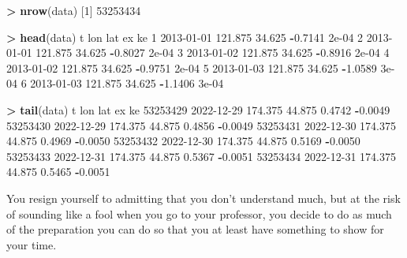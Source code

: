 \documentclass[
  10t,
]{article}
\newenvironment{Shaded}{\begin{snugshade}}{\end{snugshade}}
\newcommand{\DecValTok}[1]{\textcolor[rgb]{0.00,0.00,0.81}{#1}}
\newcommand{\FloatTok}[1]{\textcolor[rgb]{0.00,0.00,0.81}{#1}}
\newcommand{\FunctionTok}[1]{\textcolor[rgb]{0.13,0.29,0.53}{\textbf{#1}}}
\newcommand{\NormalTok}[1]{#1}
\newcommand{\SpecialCharTok}[1]{\textcolor[rgb]{0.81,0.36,0.00}{\textbf{#1}}}
\begin{document}
\begin{Shaded}
\begin{Highlighting}[]
\SpecialCharTok{\textgreater{}} \FunctionTok{nrow}\NormalTok{(data)}
\NormalTok{[}\DecValTok{1}\NormalTok{] }\DecValTok{53253434}

\SpecialCharTok{\textgreater{}} \FunctionTok{head}\NormalTok{(data)}
\NormalTok{           t     lon    lat      ex    ke}
\DecValTok{1} \DecValTok{2013{-}01{-}01} \FloatTok{121.875} \FloatTok{34.625} \SpecialCharTok{{-}}\FloatTok{0.7141} \FloatTok{2e{-}04}
\DecValTok{2} \DecValTok{2013{-}01{-}01} \FloatTok{121.875} \FloatTok{34.625} \SpecialCharTok{{-}}\FloatTok{0.8027} \FloatTok{2e{-}04}
\DecValTok{3} \DecValTok{2013{-}01{-}02} \FloatTok{121.875} \FloatTok{34.625} \SpecialCharTok{{-}}\FloatTok{0.8916} \FloatTok{2e{-}04}
\DecValTok{4} \DecValTok{2013{-}01{-}02} \FloatTok{121.875} \FloatTok{34.625} \SpecialCharTok{{-}}\FloatTok{0.9751} \FloatTok{2e{-}04}
\DecValTok{5} \DecValTok{2013{-}01{-}03} \FloatTok{121.875} \FloatTok{34.625} \SpecialCharTok{{-}}\FloatTok{1.0589} \FloatTok{3e{-}04}
\DecValTok{6} \DecValTok{2013{-}01{-}03} \FloatTok{121.875} \FloatTok{34.625} \SpecialCharTok{{-}}\FloatTok{1.1406} \FloatTok{3e{-}04}

\SpecialCharTok{\textgreater{}} \FunctionTok{tail}\NormalTok{(data)}
\NormalTok{                  t     lon    lat     ex      ke}
\DecValTok{53253429} \DecValTok{2022{-}12{-}29} \FloatTok{174.375} \FloatTok{44.875} \FloatTok{0.4742} \SpecialCharTok{{-}}\FloatTok{0.0049}
\DecValTok{53253430} \DecValTok{2022{-}12{-}29} \FloatTok{174.375} \FloatTok{44.875} \FloatTok{0.4856} \SpecialCharTok{{-}}\FloatTok{0.0049}
\DecValTok{53253431} \DecValTok{2022{-}12{-}30} \FloatTok{174.375} \FloatTok{44.875} \FloatTok{0.4969} \SpecialCharTok{{-}}\FloatTok{0.0050}
\DecValTok{53253432} \DecValTok{2022{-}12{-}30} \FloatTok{174.375} \FloatTok{44.875} \FloatTok{0.5169} \SpecialCharTok{{-}}\FloatTok{0.0050}
\DecValTok{53253433} \DecValTok{2022{-}12{-}31} \FloatTok{174.375} \FloatTok{44.875} \FloatTok{0.5367} \SpecialCharTok{{-}}\FloatTok{0.0051}
\DecValTok{53253434} \DecValTok{2022{-}12{-}31} \FloatTok{174.375} \FloatTok{44.875} \FloatTok{0.5465} \SpecialCharTok{{-}}\FloatTok{0.0051}
\end{Highlighting}
\end{Shaded}

You resign yourself to admitting that you don't understand much, but at
the risk of sounding like a fool when you go to your professor, you
decide to do as much of the preparation you can do so that you at least
have something to show for your time.
\end{document}
